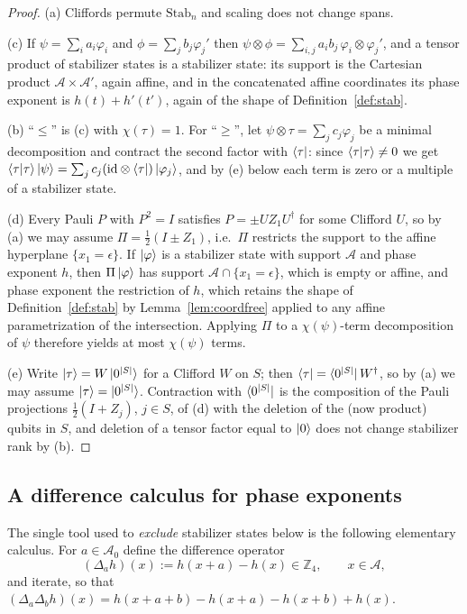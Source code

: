 \documentclass[11pt]{article}
\theoremstyle{plain}
\theoremstyle{definition}
\newcommand{\Z}{\mathbb{Z}}
\newcommand{\Stab}{\mathrm{Stab}}
\begin{document}
\begin{proof}
(a) Cliffords permute $\Stab_n$ and scaling does not change spans.

(c) If $\psi=\sum_ia_i\varphi_i$ and $\phi=\sum_jb_j\varphi_j'$ then
$\psi\otimes\phi=\sum_{i,j}a_ib_j\,\varphi_i\otimes\varphi_j'$, and a tensor product of
stabilizer states is a stabilizer state: its support is the Cartesian product
$\mathcal A\times\mathcal A'$, again affine, and in the concatenated affine coordinates
its phase exponent is $h(t)+h'(t')$, again of the shape of
Definition~\ref{def:stab}.

(b) ``$\le$'' is (c) with $\chi(\tau)=1$. For ``$\ge$'', let
$\psi\otimes\tau=\sum_jc_j\varphi_j$ be a minimal decomposition and contract the second
factor with $\bra\tau$: since $\braket{\tau|\tau}\ne0$ we get
$\braket{\tau|\tau}\ket\psi=\sum_jc_j(\mathrm{id}\otimes\bra\tau)\ket{\varphi_j}$, and by
(e) below each term is zero or a multiple of a stabilizer state.

(d) Every Pauli $P$ with $P^2=I$ satisfies $P=\pm U Z_1U^\dagger$ for some Clifford $U$,
so by (a) we may assume $\Pi=\frac12(I\pm Z_1)$, i.e.\ $\Pi$ restricts the support to
the affine hyperplane $\{x_1=\epsilon\}$. If $\ket\varphi$ is a stabilizer state with
support $\mathcal A$ and phase exponent $h$, then $\Pi\ket\varphi$ has support
$\mathcal A\cap\{x_1=\epsilon\}$, which is empty or affine, and phase exponent the
restriction of $h$, which retains the shape of Definition~\ref{def:stab} by
Lemma~\ref{lem:coordfree} applied to any affine parametrization of the intersection.
Applying $\Pi$ to a $\chi(\psi)$-term decomposition of $\psi$ therefore yields at most
$\chi(\psi)$ terms.

(e) Write $\ket\tau=W\ket{0^{|S|}}$ for a Clifford $W$ on $S$; then
$\bra\tau=\bra{0^{|S|}}W^\dagger$, so by (a) we may assume $\ket\tau=\ket{0^{|S|}}$.
Contraction with $\bra{0^{|S|}}$ is the composition of the Pauli projections
$\frac12(I+Z_j)$, $j\in S$, of (d) with the deletion of the (now product) qubits in
$S$, and deletion of a tensor factor equal to $\ket{0}$ does not change stabilizer
rank by (b).
\end{proof}

\subsection{A difference calculus for phase exponents}\label{sec:diffcalc}

The single tool used to \emph{exclude} stabilizer states below is the following
elementary calculus. For $a\in\mathcal A_0$ define the difference operator
\[
(\Delta_a h)(x):=h(x+a)-h(x)\in\Z_4,\qquad x\in\mathcal A,
\]
and iterate, so that
$(\Delta_a\Delta_bh)(x)=h(x+a+b)-h(x+a)-h(x+b)+h(x)$.
\end{document}
